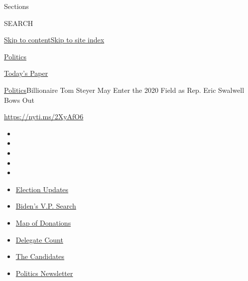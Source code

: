 Sections

SEARCH

\protect\hyperlink{site-content}{Skip to
content}\protect\hyperlink{site-index}{Skip to site index}

\href{https://www.nytimes.com/section/politics}{Politics}

\href{https://myaccount.nytimes.com/auth/login?response_type=cookie\&client_id=vi}{}

\href{https://www.nytimes.com/section/todayspaper}{Today's Paper}

\href{/section/politics}{Politics}\textbar{}Billionaire Tom Steyer May
Enter the 2020 Field as Rep. Eric Swalwell Bows Out

\url{https://nyti.ms/2XyAfO6}

\begin{itemize}
\item
\item
\item
\item
\item
\end{itemize}

\begin{itemize}
\item
  \href{https://www.nytimes.com/2020/07/31/us/elections/biden-vs-trump.html?action=click\&pgtype=Article\&state=default\&region=TOP_BANNER\&context=storylines_menu}{Election
  Updates}
\item
  \href{https://www.nytimes.com/article/biden-vice-president-2020.html?action=click\&pgtype=Article\&state=default\&region=TOP_BANNER\&context=storylines_menu}{Biden's
  V.P. Search}
\item
  \href{https://www.nytimes.com/interactive/2020/07/24/us/politics/trump-biden-campaign-donors.html?action=click\&pgtype=Article\&state=default\&region=TOP_BANNER\&context=storylines_menu}{Map
  of Donations}
\item
  \href{https://www.nytimes.com/interactive/2020/us/elections/delegate-count-primary-results.html?action=click\&pgtype=Article\&state=default\&region=TOP_BANNER\&context=storylines_menu}{Delegate
  Count}
\item
  \href{https://www.nytimes.com/interactive/2019/us/politics/2020-presidential-candidates.html?action=click\&pgtype=Article\&state=default\&region=TOP_BANNER\&context=storylines_menu}{The
  Candidates}
\item
  \href{https://www.nytimes.com/newsletters/politics?action=click\&pgtype=Article\&state=default\&region=TOP_BANNER\&context=storylines_menu}{Politics
  Newsletter}
\end{itemize}

